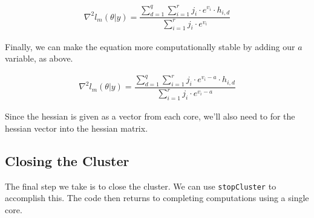 \documentclass{article}
\begin{document}
\begin{align}
\nabla^2 l_m(\theta|y) = \dfrac{\sum\limits_{d=1}^q \sum\limits_{i=1}^r j_i \cdot e^{v_i} \cdot h_{i,d}}{\sum\limits_{i=1}^r j_i \cdot e^{v_i}}
\end{align}

\noindent Finally, we can make the equation more computationally stable by adding our $a$ variable, as above.

\begin{align}
\nabla^2 l_m(\theta|y) = \dfrac{\sum\limits_{d=1}^q \sum\limits_{i=1}^r j_i \cdot e^{v_i - a} \cdot h_{i,d}}{\sum\limits_{i=1}^r j_i \cdot e^{v_i - a}}
\end{align}

Since the hessian is given as a vector from each core, we'll also need to for the hessian vector into the hessian matrix. 

\subsection{Closing the Cluster}
The final step we take is to close the cluster. We can use \texttt{stopCluster} to accomplish this. The code then returns to completing computations using a single core. 
\end{document}
